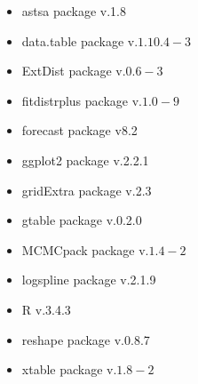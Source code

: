 \documentclass[oneside,12pt,final]{sty/ucthesis-CA2012}
\let\cite\citep                             %
\begin{document}
\begin{mainmatter}
\begin{itemize}
\item astsa package v.1.8 \cite{astsa}
\item data.table package v.$1.10.4-3$  \cite{datatable}
\item ExtDist package v.$0.6-3$ \cite{extdist}
\item fitdistrplus package v.$1.0-9$ \cite{fitdistrplus}
\item forecast package v8.2 \cite{forecast1, forecast2} 
\item ggplot2 package v.2.2.1 \cite{ggplot}
\item gridExtra package v.2.3 \cite{gridextra}
\item gtable package v.0.2.0 \cite{gtable}
\item MCMCpack package v.$1.4-2$ \cite{mcmcpack}
\item logspline package v.2.1.9 \cite{logspline}
\item R v.3.4.3 \cite{Rcite} 
\item reshape package v.0.8.7 \cite{reshape}
\item xtable package v.$1.8-2$ \cite{xtable}
\end{itemize}





\end{mainmatter}

\ssp
\newcommand{\newblock}{}


\end{document}
